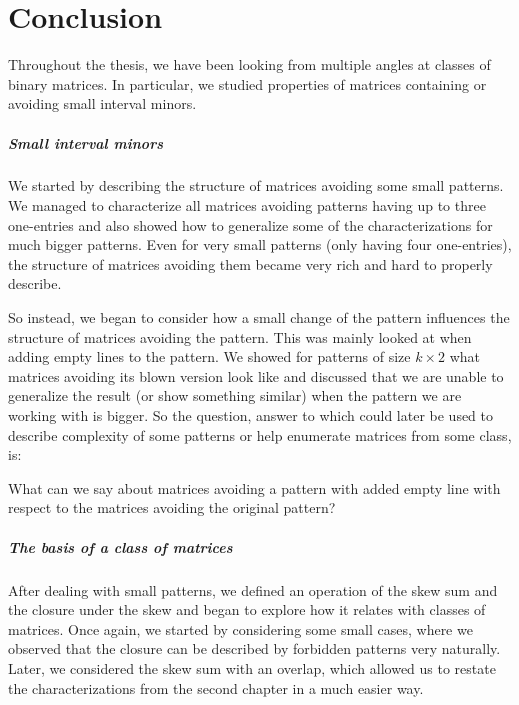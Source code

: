 \chapter*{Conclusion}
Throughout the thesis, we have been looking from multiple angles at classes of binary matrices. In particular, we studied properties of matrices containing or avoiding small interval minors.

\paragraph{Small interval minors}
We started by describing the structure of matrices avoiding some small patterns. We managed to characterize all matrices avoiding patterns having up to three one-entries and also showed how to generalize some of the characterizations for much bigger patterns. Even for very small patterns (only having four one-entries), the structure of matrices avoiding them became very rich and hard to properly describe.

So instead, we began to consider how a small change of the pattern influences the structure of matrices avoiding the pattern. This was mainly looked at when adding empty lines to the pattern. We showed for patterns of size $k\times2$ what matrices avoiding its blown version look like and discussed that we are unable to generalize the result (or show something similar) when the pattern we are working with is bigger. So the question, answer to which could later be used to describe complexity of some patterns or help enumerate matrices from some class, is:
\begin{ques}
What can we say about matrices avoiding a pattern with added empty line with respect to the matrices avoiding the original pattern?
\end{ques}

\paragraph{The basis of a class of matrices}
After dealing with small patterns, we defined an operation of the skew sum and the closure under the skew and began to explore how it relates with classes of matrices. Once again, we started by considering some small cases, where we observed that the closure can be described by forbidden patterns very naturally. Later, we considered the skew sum with an overlap, which allowed us to restate the characterizations from the second chapter in a much easier way.

